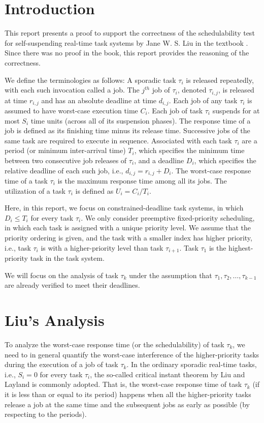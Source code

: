 \section{Introduction}

This report presents a proof to support the correctness of the schedulability test for self-suspending real-time task systems by Jane W. S. Liu in the textbook \cite{Liu:2000:RS:518501}. Since there was no proof in the book, this report provides the reasoning of the correctness.  

We define the
terminologies as follows:  A sporadic task
$\tau_i$ is released repeatedly, with each such invocation called a
job. The $j^{th}$ job of $\tau_i$, denoted $\tau_{i,j}$, is released
at time $r_{i,j}$ and has an absolute deadline at time $d_{i,j}$. Each
job of any task $\tau_i$ is assumed to have worst-case execution time $C_i$. Each job of task $\tau_i$ 
suspends for at most $S_i$ time units (across all of its suspension phases).
The response time
of a job is defined as its finishing time minus its release
time. Successive jobs of the same task are required to execute in
sequence. Associated with each task $\tau_i$ are a period (or minimum inter-arrival time) $T_i$, which
specifies the minimum time between two consecutive job releases of
$\tau_i$, and a deadline $D_i$, which specifies the relative deadline
of each such job, i.e., $d_{i,j}=r_{i,j}+D_i$. The worst-case response
time of a task $\tau_i$ is the maximum response time among all its
jobs.  The utilization of a task $\tau_i$ is defined as $U_i=C_i/T_i$.

Here, in this report, we focus on constrained-deadline task systems, in which $D_i \leq T_i$ for every task $\tau_i$. We only consider preemptive fixed-priority scheduling, in which each task is assigned with a unique priority level. We assume that the priority ordering is given, and the task with a smaller index has higher priority, i.e., task $\tau_i$ is with a higher-priority level than task $\tau_{i+1}$. Task $\tau_1$ is the highest-priority task in the task system.

We will focus on the analysis of task $\tau_k$ under the assumption that $\tau_1, \tau_2, \ldots, \tau_{k-1}$ are already verified to meet their deadlines. 

\section{Liu's Analysis}

To analyze the worst-case response time (or the schedulability) of task $\tau_k$, we need to in general quantify the worst-case interference of the higher-priority tasks during the execution of a job of task $\tau_k$. In the ordinary sporadic real-time tasks, i.e., $S_i=0$ for every task $\tau_i$, the so-called critical instant theorem by Liu and Layland \cite{Liu_1973} is commonly adopted. That is, the worst-case response time of task $\tau_k$ (if it is less than or equal to its period) happens when all the higher-priority tasks release a job at the same time and the subsequent jobs as early as possible (by respecting to the periods). 

